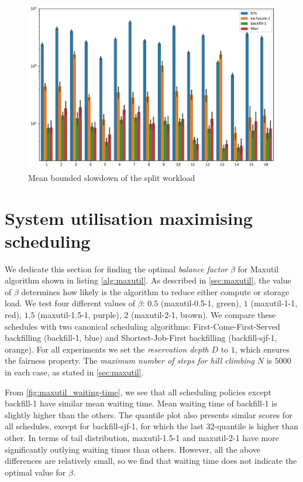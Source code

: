 \documentclass[thesis-en.tex]{subfiles}
\begin{document}
\begin{figure}[p]
    \centering
    \includegraphics[width=\textwidth]{reservation_io-aware_parts_bounded-slowdown.pdf}
    \caption{Mean bounded slowdown of the split workload}
    \label{fig:reservation_io-aware_parts_bounded-slowdown}
\end{figure}

\FloatBarrier

\section{System utilisation maximising scheduling} \label{sec:maxutil-results}
We dedicate this section for finding the optimal \emph{balance factor} $\beta$ for Maxutil algorithm shown in listing \ref{alg:maxutil}. As described in \autoref{sec:maxutil}, the value of $\beta$ determines how likely is the algorithm to reduce either compute or storage load. We test four different values of $\beta$: $0.5$ (maxutil-0.5-1, green), $1$ (maxutil-1-1, red), $1.5$ (maxutil-1.5-1, purple), $2$ (maxutil-2-1, brown). We compare these schedules with two canonical scheduling algorithms: First-Come-First-Served backfilling (backfill-1, blue) and Shortest-Job-First backfilling (backfill-sjf-1, orange). For all experiments we set the \emph{reservation depth} $D$ to $1$, which ensures the fairness property. The \emph{maximum number of steps for hill climbing} $N$ is $5000$ in each case, as stated in \autoref{sec:maxutil}.

From \autoref{fig:maxutil_waiting-time}, we see that all scheduling policies except backfill-1 have similar mean waiting time. Mean waiting time of backfill-1 is slightly higher than the others. The quantile plot also presents similar scores for all schedules, except for backfill-sjf-1, for which the last 32-quantile is higher than other. In terms of tail distribution, maxutil-1.5-1 and maxutil-2-1 have more significantly outlying waiting times than others. However, all the above differences are relatively small, so we find that waiting time does not indicate the optimal value for $\beta$.
\end{document}

